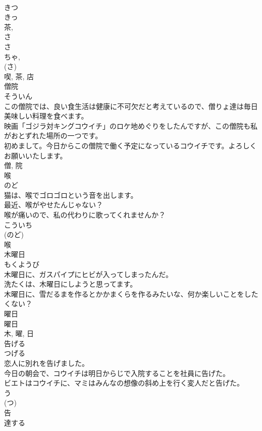 \documentclass[8pt]{extreport}
\begin{document}
\begin{CJK}{UTF8}{min}
\\	きつ 
\\	きっ 
\\	茶, 
\\	さ 
\\	さ 
\\	ちゃ, 
\\	(さ) 
\\	喫, 茶, 店	
\\	僧院	
\\	そういん	
\\	この僧院では、良い食生活は健康に不可欠だと考えているので、僧りょ達は毎日美味しい料理を食べます。	
\\	映画「ゴジラ対キングコウイチ」のロケ地めぐりをしたんですが、この僧院も私がおとずれた場所の一つです。	
\\	初めまして。今日からこの僧院で働く予定になっているコウイチです。よろしくお願いいたします。	
\\	僧, 院	
\\	喉	
\\	のど	
\\	猫は、喉でゴロゴロという音を出します。	
\\	最近、喉がやせたんじゃない？	
\\	喉が痛いので、私の代わりに歌ってくれませんか？	
\\	こういち 
\\	(のど)
\\	喉	
\\	木曜日	
\\	もくようび	
\\	木曜日に、ガスパイプにヒビが入ってしまったんだ。	
\\	洗たくは、木曜日にしようと思ってます。	
\\	木曜日に、雪だるまを作るとかかまくらを作るみたいな、何か楽しいことをしたくない？	
\\	曜日 
\\	曜日 
\\	木, 曜, 日	
\\	告げる	
\\	つげる	
\\	恋人に別れを告げました。	
\\	今日の朝会で、コウイチは明日からじで入院することを社員に告げた。	
\\	ビエトはコウイチに、マミはみんなの想像の斜め上を行く変人だと告げた。	
\\	う 
\\	(つ) 
\\	告	
\\	達する	

\end{CJK}
\end{document}
